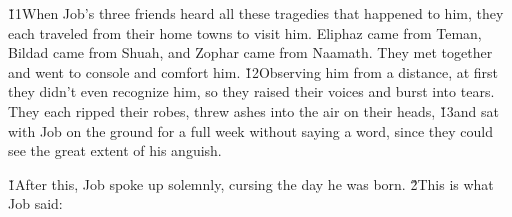 \v{11}When Job's three friends heard all these tragedies that happened to him, they each traveled from their home towns to visit him. Eliphaz came from Teman, Bildad came from Shuah, and Zophar came from Naamath. They met together and went to console and comfort him. \v{12}Observing him from a distance, at first they didn't even recognize him, so they raised their voices and burst into tears. They each ripped their robes, threw ashes into the air on their heads, \v{13}and sat with Job on the ground for a full week without saying a word, since they could see the great extent of his anguish.

\v{1}After this, Job spoke up solemnly, cursing the day he was born. \v{2}This is what Job said:


